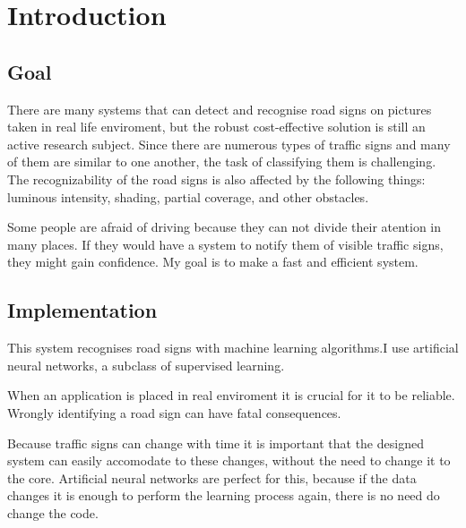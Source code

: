 \chapter{Introduction}\label{ch:INTRO}

\section{Goal}\label{sec:INTRO:goal}

There are many systems that can detect and recognise road signs on pictures taken in real life enviroment, but the robust cost-effective solution is still an active research subject. Since there are numerous types of traffic signs and many of them are similar to one another, the task of classifying them is challenging. The recognizability of the road signs is also affected by the following things: luminous intensity, shading, partial coverage, and other obstacles.

Some people are afraid of driving because they can not divide their atention in many places. If they would have a system to notify them of visible traffic signs, they might gain confidence. My goal is to make a fast and efficient system. 

\section{Implementation}\label{sec:INTRO:implement}

This system recognises road signs with machine learning algorithms.I use artificial neural networks, a subclass of supervised learning.

When an application is placed in real enviroment it is crucial for it to be reliable. Wrongly identifying a road sign can have fatal consequences.

Because traffic signs can change with time it is important that the designed system can easily accomodate to these changes, without the need to change it to the core. Artificial neural networks are perfect for this, because if the data changes it is enough to perform the learning process again, there is no need do change the code.